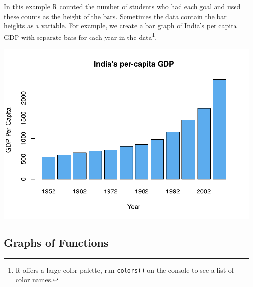 \documentclass[
]{krantz}
\makeatletter
\newenvironment{Shaded}{\begin{snugshade}}{\end{snugshade}}
\newcommand{\DataTypeTok}[1]{\textcolor[rgb]{0.27,0.27,0.27}{#1}}
\newcommand{\KeywordTok}[1]{\textcolor[rgb]{0.27,0.27,0.27}{\textbf{#1}}}
\newcommand{\NormalTok}[1]{#1}
\newcommand{\OperatorTok}[1]{\textcolor[rgb]{0.43,0.43,0.43}{\textbf{#1}}}
\newcommand{\StringTok}[1]{\textcolor[rgb]{0.5,0.5,0.5}{#1}}
\newenvironment{kframe}{%
\medskip{}
\setlength{\fboxsep}{.8em}
 \def\at@end@of@kframe{}%
 \ifinner\ifhmode%
  \def\at@end@of@kframe{\end{minipage}}%
  \begin{minipage}{\columnwidth}%
 \fi\fi%
 \def\FrameCommand##1{\hskip\@totalleftmargin \hskip-\fboxsep
 \colorbox{shadecolor}{##1}\hskip-\fboxsep
     \hskip-\linewidth \hskip-\@totalleftmargin \hskip\columnwidth}%
 \MakeFramed {\advance\hsize-\width
   \@totalleftmargin\z@ \linewidth\hsize
   \@setminipage}}%
 {\par\unskip\endMakeFramed%
 \at@end@of@kframe}
\renewenvironment{Shaded}{\begin{kframe}}{\end{kframe}}
\makeatother
\begin{document}
In this example R counted the number of students who had each goal and used these counts as the height of the bars. Sometimes the data contain the bar heights as a variable. For example, we create a bar graph of India's per capita GDP with separate bars for each year in the data\footnote{R offers a large color palette, run \texttt{colors()} on the console to see a list of color names.}.

\begin{Shaded}
\end{Shaded}

\includegraphics{bookdown_files/figure-latex/unnamed-chunk-361-1.pdf}

\hypertarget{graphs-of-functions-1}{%
\subsection{Graphs of Functions}\label{graphs-of-functions-1}}
\end{document}

